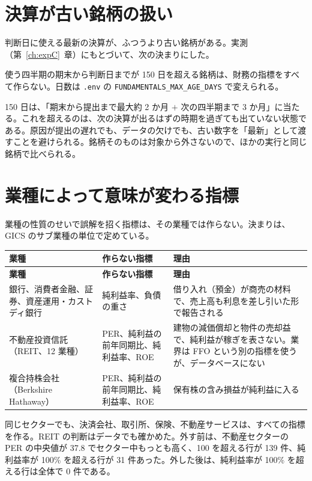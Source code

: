 \documentclass[xelatex,ja=standard,jafont=hiragino-pron,a4paper,10pt]{bxjsreport}
\newcommand{\code}[1]{\texttt{#1}}
\newcommand{\chapref}[1]{第~\ref{#1}~章}
\begin{document}
\section{決算が古い銘柄の扱い}

判断日に使える最新の決算が、ふつうより古い銘柄がある。実測（\chapref{ch:expC}）にもとづいて、次の決まりにした。

\begin{keybox}[決まり]
使う四半期の期末から判断日までが 150 日を超える銘柄は、財務の指標をすべて作らない。日数は \code{.env} の \code{FUNDAMENTALS\_MAX\_AGE\_DAYS} で変えられる。
\end{keybox}

150 日は、「期末から提出まで最大約 2 か月 $+$ 次の四半期まで 3 か月」に当たる。これを超えるのは、次の決算が出るはずの時期を過ぎても出ていない状態である。原因が提出の遅れでも、データの欠けでも、古い数字を「最新」として渡すことを避けられる。銘柄そのものは対象から外さないので、ほかの実行と同じ銘柄で比べられる。

\section{業種によって意味が変わる指標}

業種の性質のせいで誤解を招く指標は、その業種では作らない。決まりは、GICS のサブ業種の単位で定めている。

\begin{longtable}{p{4.60cm}p{4.20cm}p{5.60cm}}
\toprule
\textbf{業種} & \textbf{作らない指標} & \textbf{理由} \\
\midrule
\endfirsthead
\toprule
\textbf{業種} & \textbf{作らない指標} & \textbf{理由} \\
\midrule
\endhead
\bottomrule
\endfoot
銀行、消費者金融、証券、資産運用・カストディ銀行 & 純利益率、負債の重さ & 借り入れ（預金）が商売の材料で、売上高も利息を差し引いた形で報告される \\
不動産投資信託（REIT、12 業種） & PER、純利益の前年同期比、純利益率、ROE & 建物の減価償却と物件の売却益で、純利益が稼ぎを表さない。業界は FFO という別の指標を使うが、データベースにない \\
複合持株会社（Berkshire Hathaway） & PER、純利益の前年同期比、純利益率、ROE & 保有株の含み損益が純利益に入る \\
\end{longtable}

同じセクターでも、決済会社、取引所、保険、不動産サービスは、すべての指標を作る。REIT の判断はデータでも確かめた。外す前は、不動産セクターの PER の中央値が 37.8 でセクター中もっとも高く、100 を超える行が 139 件、純利益率が 100\% を超える行が 31 件あった。外した後は、純利益率が 100\% を超える行は全体で 0 件である。
\end{document}
